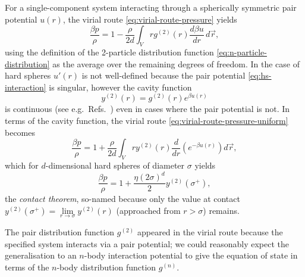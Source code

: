 \begin{tcolorbox}[title=Contact theorem for hard spheres]
  For a single-component system interacting through a spherically symmetric pair potential $u(r)$, the virial route \eqref{eq:virial-route-pressure} yields
  \begin{equation}\label{eq:virial-route-pressure-uniform}
    \frac{\beta p}{\rho}
    =
    1
    -
    \frac{\rho}{2 d}
    \int_V
    r g^{(2)}(r) \frac{d \beta u}{d r} \, d\vec{r},
  \end{equation}
  using the definition of the 2-particle distribution function \eqref{eq:n-particle-distribution} as the average over the remaining degrees of freedom.
  In the case of hard spheres $u'(r)$ is not well-defined because the pair potential \eqref{eq:hs-interaction} is singular, however the cavity function
  \begin{equation*}\label{eq:cavity-function}
    y^{(2)}(r) = g^{(2)}(r) e^{\beta u(r)}
  \end{equation*}
  is continuous (see e.g.\ Refs.\ \cite{Hansen2013,Santos2016}) even in cases where the pair potential is not.
  In terms of the cavity function, the virial route \eqref{eq:virial-route-pressure-uniform} becomes
  \begin{equation*}\label{eq:virial-route-pressure-cavity}
    \frac{\beta p}{\rho}
    =
    1
    +
    \frac{\rho}{2 d}
    \int_V
    r y^{(2)}(r) \frac{d}{dr} \left( e^{-\beta u(r)} \right)
    d\vec{r},
  \end{equation*}
  which for $d$-dimensional hard spheres of diameter $\sigma$ yields
  \begin{equation}\label{eq:contact-theorem}
    \frac{\beta p}{\rho}
    =
    1
    +
    \frac{\eta (2\sigma)^d}{2}
    y^{(2)}(\sigma^+),
  \end{equation}
   the \emph{contact theorem}, so-named because only the value at contact $y^{(2)}(\sigma^+) = \lim\limits_{r\to\sigma} y^{(2)}(r)$ (approached from $r > \sigma$) remains.
\end{tcolorbox}

The pair distribution function $g^{(2)}$ appeared in the virial route because the specified system interacts via a pair potential; we could reasonably expect the generalisation to an $n$-body interaction potential to give the equation of state in terms of the $n$-body distribution function $g^{(n)}$.

